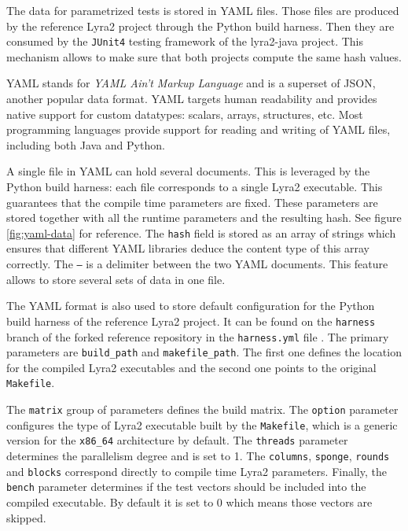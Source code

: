 The data for parametrized tests is stored in YAML files. Those files are produced by the reference Lyra2 project through the Python build harness. Then they are consumed by the \texttt{JUnit4} testing framework of the lyra2-java project. This mechanism allows to make sure that both projects compute the same hash values.

YAML stands for \emph{YAML Ain't Markup Language} and is a superset of JSON, another popular data format. YAML targets human readability and provides native support for custom datatypes: scalars, arrays, structures, etc. Most programming languages provide support for reading and writing of YAML files, including both Java and Python.

A single file in YAML can hold several documents. This is leveraged by the Python build harness: each file corresponds to a single Lyra2 executable. This guarantees that the compile time parameters are fixed. These parameters are stored together with all the runtime parameters and the resulting hash. See figure \ref{fig:yaml-data} for reference. The \texttt{hash} field is stored as an array of strings which ensures that different YAML libraries deduce the content type of this array correctly. The \texttt{---} is a delimiter between the two YAML documents. This feature allows to store several sets of data in one file.

The YAML format is also used to store default configuration for the Python build harness of the reference Lyra2 project. It can be found on the \texttt{harness} branch of the forked reference repository in the \texttt{harness.yml} file \cite{github:2017:lyra-copy}. The primary parameters are \texttt{build_path} and \texttt{makefile_path}. The first one defines the location for the compiled Lyra2 executables and the second one points to the original \texttt{Makefile}.

The \texttt{matrix} group of parameters defines the build matrix. The \texttt{option} parameter configures the type of Lyra2 executable built by the \texttt{Makefile}, which is a generic version for the \texttt{x86_64} architecture by default. The \texttt{threads} parameter determines the parallelism degree and is set to 1. The \texttt{columns}, \texttt{sponge}, \texttt{rounds} and \texttt{blocks} correspond directly to compile time Lyra2 parameters. Finally, the \texttt{bench} parameter determines if the test vectors should be included into the compiled executable. By default it is set to 0 which means those vectors are skipped.

